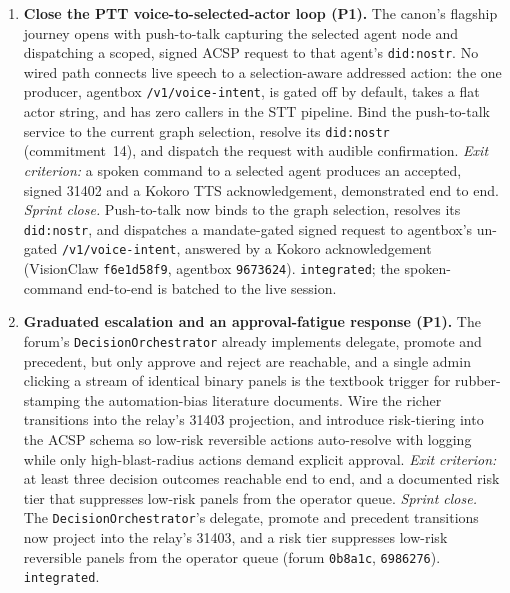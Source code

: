 \begin{enumerate}[start=13]
  \item \textbf{Close the PTT voice-to-selected-actor loop (P1).} The canon's flagship journey opens with push-to-talk capturing the selected agent node and dispatching a scoped, signed ACSP request to that agent's \texttt{did:nostr}. No wired path connects live speech to a selection-aware addressed action: the one producer, agentbox \texttt{/v1/voice-intent}, is gated off by default, takes a flat actor string, and has zero callers in the STT pipeline. Bind the push-to-talk service to the current graph selection, resolve its \texttt{did:nostr} (commitment~14), and dispatch the request with audible confirmation. \emph{Exit criterion:} a spoken command to a selected agent produces an accepted, signed 31402 and a Kokoro TTS acknowledgement, demonstrated end to end. \emph{Sprint close.} Push-to-talk now binds to the graph selection, resolves its \texttt{did:nostr}, and dispatches a mandate-gated signed request to agentbox's un-gated \texttt{/v1/voice-intent}, answered by a Kokoro acknowledgement (VisionClaw \texttt{f6e1d58f9}, agentbox \texttt{9673624}). \texttt{integrated}; the spoken-command end-to-end is batched to the live session.

  \item \textbf{Graduated escalation and an approval-fatigue response (P1).} The forum's \texttt{DecisionOrchestrator} already implements delegate, promote and precedent, but only approve and reject are reachable, and a single admin clicking a stream of identical binary panels is the textbook trigger for rubber-stamping the automation-bias literature documents. Wire the richer transitions into the relay's 31403 projection, and introduce risk-tiering into the ACSP schema so low-risk reversible actions auto-resolve with logging while only high-blast-radius actions demand explicit approval. \emph{Exit criterion:} at least three decision outcomes reachable end to end, and a documented risk tier that suppresses low-risk panels from the operator queue. \emph{Sprint close.} The \texttt{DecisionOrchestrator}'s delegate, promote and precedent transitions now project into the relay's 31403, and a risk tier suppresses low-risk reversible panels from the operator queue (forum \texttt{0b8a1c}, \texttt{6986276}). \texttt{integrated}.


\end{enumerate}
